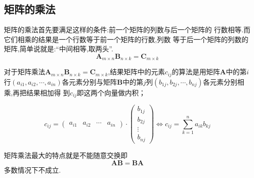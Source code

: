 \subsection{矩阵的乘法}
矩阵的乘法首先要满足这样的条件:前一个矩阵的列数与后一个矩阵的
行数相等.而它们相乘的结果是一个行数等于前一个矩阵的行数,列数
等于后一个矩阵的列数的矩阵,简单说就是:“中间相等,取两头”.
\[
    \bm{A}_{m \times n} \bm{B}_{n \times k} = \bm{C}_{m \times k}
\]
\begin{formal}
\begin{definition}[矩阵乘法]\label{def:矩阵乘法}
    对于矩阵乘法$\bm{A}_{m\times n}\bm{B}_{n\times k}=\bm{C}_{m\times k}$,结果矩阵中的元素$c_{ij}$的算法是用矩阵$
\bm{A}$中的第$i$行$\left(a_{i1},a_{i2},\cdots ,a_{in
}\right)$各元素分别与矩阵$\bm{B}$中的第$
j$列$\left(b_{1j},b_{2j},\cdots,
b_{nj}\right)$各元素分别相乘,再把结果相加得
到$c_{ij}$即这两个向量做内积；
\vfill

\[
c_{ij}=
    \begin{pmatrix}
        a_{i1} & a_{i2} & \cdots & a_{in}
    \end{pmatrix}
    \cdot 
    \begin{pmatrix}
        b_{1j}\\
        b_{2j}\\
        \vdots\\
        b_{nj}
    \end{pmatrix}\Longleftrightarrow
    c_{ij} = \sum _{k=1} ^{n} a_{ik}b_{kj}
\]
\end{definition}
\end{formal}
\begin{red}
\begin{remark}
    矩阵乘法最大的特点就是不能随意交换即
\[
 \bm{A}\bm{B}=\bm{B}\bm{A}
\]
多数情况下不成立.
\end{remark}
\end{red}
